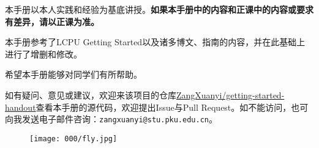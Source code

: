 本手册以本人实践和经验为基底讲授。\textbf{如果本手册中的内容和正课中的内容或要求有差异，请以正课为准。}

本手册参考了LCPU Getting Started以及诸多博文、指南的内容，并在此基础上进行了增删和修改。

希望本手册能够对同学们有所帮助。

如有疑问、意见或建议，欢迎来该项目的仓库\faGithub\href{https://github.com/ZangXuanyi/getting-started-handout}{ZangXuanyi/getting-started-handout}查看本手册的源代码，欢迎提出Issue与Pull Request。如不能访问，也可向我发送电子邮件咨询：\texttt{zangxuanyi@stu.pku.edu.cn}。

\begin{figure}[ht]
  \centering
  \texttt{[image: 000/fly.jpg]}
\end{figure}